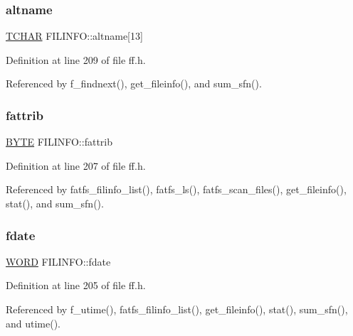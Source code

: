 \subsubsection{\texorpdfstring{altname}{altname}}
{\footnotesize\ttfamily \hyperlink{ff_8h_a03bdb8ce5895c7e261aadc2529637546}{T\+C\+H\+AR} F\+I\+L\+I\+N\+F\+O\+::altname\mbox{[}13\mbox{]}}



Definition at line 209 of file ff.\+h.



Referenced by f\+\_\+findnext(), get\+\_\+fileinfo(), and sum\+\_\+sfn().

\mbox{\label{structFILINFO_a838d542585831b085537b363f18205c0}} 
\subsubsection{\texorpdfstring{fattrib}{fattrib}}
{\footnotesize\ttfamily \hyperlink{integer_8h_a4ae1dab0fb4b072a66584546209e7d58}{B\+Y\+TE} F\+I\+L\+I\+N\+F\+O\+::fattrib}



Definition at line 207 of file ff.\+h.



Referenced by fatfs\+\_\+filinfo\+\_\+list(), fatfs\+\_\+ls(), fatfs\+\_\+scan\+\_\+files(), get\+\_\+fileinfo(), stat(), and sum\+\_\+sfn().

\mbox{\label{structFILINFO_a7c01c48a15b1b49da459924437b0bd52}} 
\subsubsection{\texorpdfstring{fdate}{fdate}}
{\footnotesize\ttfamily \hyperlink{integer_8h_a197942eefa7db30960ae396d68339b97}{W\+O\+RD} F\+I\+L\+I\+N\+F\+O\+::fdate}



Definition at line 205 of file ff.\+h.



Referenced by f\+\_\+utime(), fatfs\+\_\+filinfo\+\_\+list(), get\+\_\+fileinfo(), stat(), sum\+\_\+sfn(), and utime().

\mbox{\label{structFILINFO_a7c3ce2dd03dc9a9726967fc43116079f}} 
